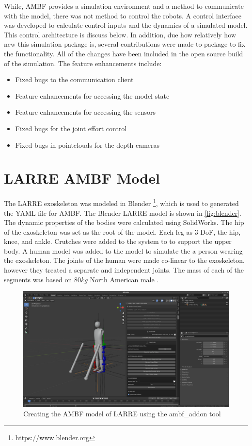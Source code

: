  While, AMBF provides a simulation environment and a method to communicate with the model, there was not method to control the robots. A control interface was developed to calculate control inputs and the dynamics of a simulated model. This control architecture is discuss below. In addition, due how relatively how new this simulation package is, several contributions were made to package to fix the functionality. All of the changes have been included in the open source build of the simulation. The feature enhancements include:
 \begin{itemize}
     \item Fixed bugs to the communication client
     \item Feature enhancements for accessing the model state
     \item Feature enhancements for accessing the sensors 
     \item Fixed bugs for the joint effort control
     \item Fixed bugs in pointclouds for the depth cameras
 \end{itemize}
 
 \section{LARRE AMBF Model}
 
 The LARRE exoskeleton was modeled in Blender \footnote{https://www.blender.org}, which is used to generated the YAML file for AMBF. The Blender LARRE model is shown in \autoref{fig:blender}. The dynamic properties of the bodies were calculated using SolidWorks. The hip of the exoskeleton was set as the root of the model. Each leg as 3 DoF, the hip, knee, and ankle. Crutches were added to the system to to support the upper body. A human model was added to the model to simulate the a person wearing the exoskeleton. The joints of the human were made co-linear to the exoskeleton, however they treated a separate and independent joints. The mass of each of the segments was based on $80kg$ North American male \cite{BMI} \cite{drillis1964body}.
 
 \begin{figure}[h]
     \centering
     \includegraphics[scale=0.2]{images/sim/blender.png}
     \caption[Blender Model of LARRE]{Creating the AMBF model of LARRE using the ambf\_addon tool}
     \label{fig:blender}
 \end{figure}
 
